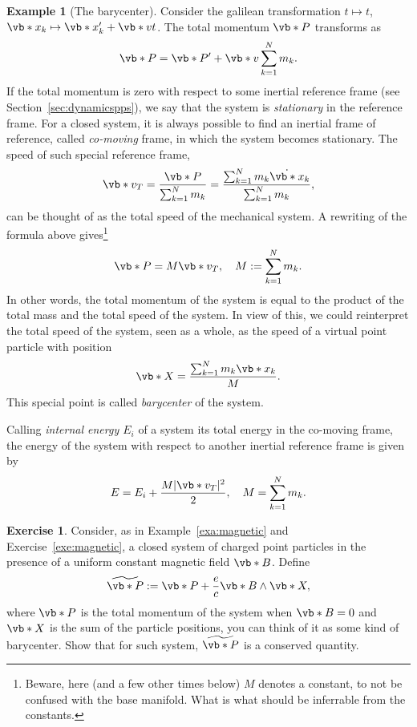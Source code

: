 \documentclass[english,fontsize=11pt,paper=b5]{scrbook}
\numberwithin{equation}{chapter}
\theoremstyle{definition}
\newtheorem{example}{Example}[chapter]
\newtheorem{exercise}{Exercise}[chapter]
\begin{document}
    \begin{example}[The barycenter]
      Consider the galilean transformation $t \mapsto t$, $\vb*{x}_k \mapsto \vb*{x}'_k + \vb*{v}t$.
      The total momentum $\vb*{P}$ transforms as
      \begin{equation}
        \vb*{P} = \vb*{P}' + \vb*{v}  \sum_{k=1}^N m_k.
      \end{equation}
      If the total momentum is zero with respect to some inertial reference frame (see Section~\ref{sec:dynamicspps}), we say that the system is \emph{stationary} in the reference frame. For a closed system, it is always possible to find an inertial frame of reference, called \emph{co-moving} frame, in which the system becomes stationary. The speed of such special reference frame,
      \begin{equation}
        \vb*{v_T} = \frac{\vb*{P}}{\sum_{k=1}^N m_k}
        = \frac{\sum_{k=1}^N m_k \dot{\vb*{x}}_k}{\sum_{k=1}^N m_k},
      \end{equation}
      can be thought of as the total speed of the mechanical system.
      A rewriting of the formula above gives\footnote{Beware, here (and a few other times below) $M$ denotes a constant, to not be confused with the base manifold. What is what should be inferrable from the constants.}
      \begin{equation}
        \vb*{P} = M \vb*{v_T}, \quad M:= \sum_{k=1}^N m_k.
      \end{equation}
      In other words, the total momentum of the system is equal to the product of the total mass and the total speed of the system.
      In view of this, we could reinterpret the total speed of the system, seen as a whole, as the speed of a virtual point particle with position
      \begin{equation}
        \vb*{X} = \frac{\sum_{k=1}^N m_k \vb*{x}_k}{M}.
      \end{equation}
      This special point is called \emph{barycenter} of the system.
      \medskip

      Calling \emph{internal energy $E_i$} of a system its total energy in the co-moving frame, the energy of the system with respect to another inertial reference frame is given by
      \begin{equation}
        E = E_i + \frac{M |\vb*{v_T}|^2}{2}, \quad M= \sum_{k=1}^N m_k.
      \end{equation}
    \end{example}

    \begin{exercise}
      Consider, as in Example~\ref{exa:magnetic} and Exercise~\ref{exe:magnetic}, a closed system of charged point particles in the presence of a uniform constant magnetic field $\vb*{B}$. Define
      \begin{equation}
        \widetilde{\vb*{P}} := \vb*{P} + \frac{e}c \vb*{B}\wedge \vb*{X},
      \end{equation}
      where $\vb*{P}$ is the total momentum of the system when $\vb*{B} = 0$ and $\vb*{X}$ is the sum of the particle positions, you can think of it as some kind of barycenter.
      Show that for such system, $\widetilde{\vb*{P}}$ is a conserved quantity.
    \end{exercise}
\end{document}
